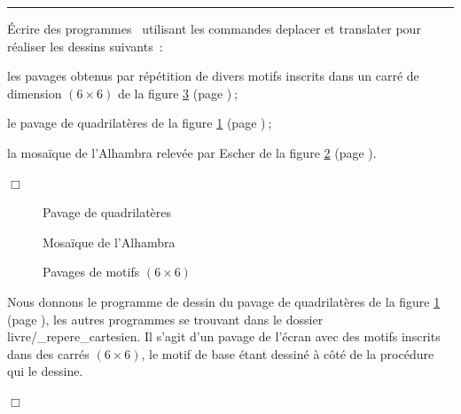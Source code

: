 \noindent \rule{137mm}{0.1mm} %
\begin{exercices}{Écrire des programmes \ocaml\  utilisant les commandes
{\idt de\-pla\-cer} et {\idt translater} pour réaliser les dessins suivants~:

\tiret  les pavages obtenus par répétition de divers motifs inscrits dans un carré de
dimension $(6 \times 6)$ de la figure \ref{fig:pm6x6} (page \pageref{fig:pm6x6})$\:$;

\tiret  le pavage de quadrilatères de la figure \ref{fig:pavqua} (page \pageref{fig:pavqua})$\:$;

\tiret  la mosaïque de l'Alhambra relevée par Escher \cite{escher1} de la figure 
\ref{fig:mosa5} (page \pageref{fig:mosa5}).

\noindent $\Box$}\end{exercices}
\begin{figure}[htbp]
 \caption{Pavage de quadrilatères}\label{fig:pavqua}
\end{figure}
\begin{figure}[htbp]
 \caption{Mosaïque de l'Alhambra}\label{fig:mosa5}
\end{figure}
\begin{figure}[htbp]
 \caption{Pavages de motifs $(6 \times 6)$}\label{fig:pm6x6}
\end{figure}
\begin{corrige}{
Nous donnons le programme de dessin du pavage de quadrilatères de la figure \ref{fig:pavqua} (page 
\pageref{fig:pavqua}), les autres programmes se trouvant dans le dossier {\idt livre/\_repere\_cartesien}. Il s'agit d'un pavage de
l'écran avec des motifs inscrits dans des carrés $(6 \times 6)$, le motif de base étant
dessiné à côté de la procédure qui le dessine.

\noindent $\Box$}\end{corrige}
\vfill

